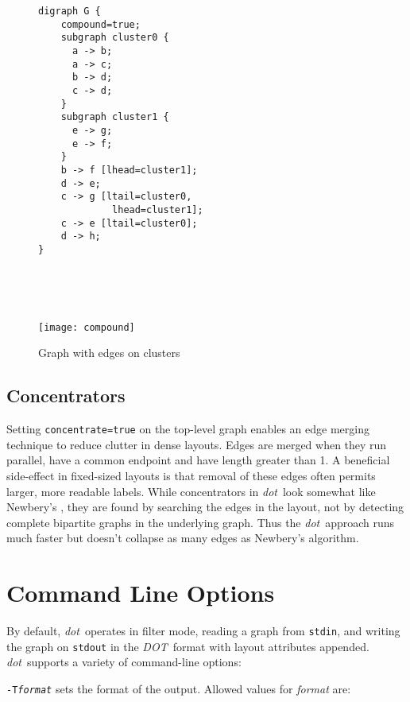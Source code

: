 \documentclass[11pt]{article}
\def\dot{{\it dot}}
\def\DOT{{\it DOT}}
\begin{document}
\begin{figure}[p]
\begin{minipage}[t]{2.25in}
\begin{verbatim}
digraph G {
    compound=true;
    subgraph cluster0 {
      a -> b;
      a -> c;
      b -> d;
      c -> d;
    }
    subgraph cluster1 {
      e -> g;
      e -> f;
    }
    b -> f [lhead=cluster1];
    d -> e;
    c -> g [ltail=cluster0,
             lhead=cluster1];
    c -> e [ltail=cluster0];
    d -> h;
}
\end{verbatim}
\end{minipage} \hspace{0.5in} \
\parbox[t]{2.0in}{
    \ \\
	\centerline {
		\texttt{[image: compound]}
	}
}
    \caption{Graph with edges on clusters}
    \label{fig:compound}
\end{figure}

\subsection{Concentrators}
Setting \verb"concentrate=true" on the top-level graph enables 
an edge merging technique to reduce clutter in dense layouts.
Edges are merged when they run parallel, have a common endpoint
and have length greater than 1.
A beneficial side-effect in fixed-sized layouts is that removal
of these edges often permits larger, more readable labels.
While concentrators in \dot\ look somewhat like Newbery's
\cite{newbery:concentrators}, they are found by searching
the edges in the layout, not by detecting complete bipartite graphs in
the underlying graph.  Thus the \dot\ approach runs much faster
but doesn't collapse as many edges as Newbery's algorithm.

\section{Command Line Options}

By default, \dot\ operates in filter mode,
reading a graph from {\tt stdin}, and
writing the graph on {\tt stdout} in the \DOT\ format with 
layout attributes appended.
\dot\ supports a variety of command-line options:

{\tt-T{\it format}} sets the format of the output. Allowed values
for {\it format} are:
\end{document}
